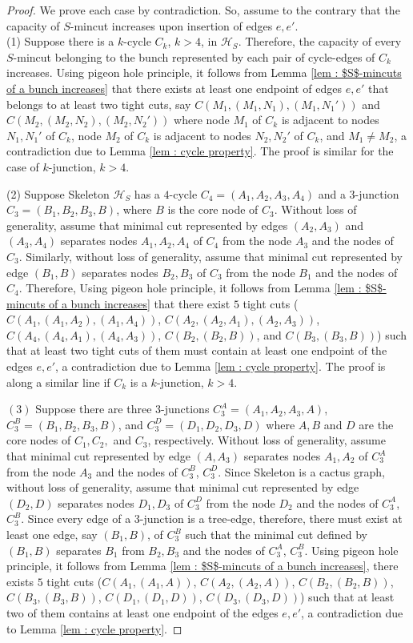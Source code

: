 \documentclass[letterpaper,11pt]{article}
\begin{document}
\begin{proof}
    We prove each case by contradiction. So, assume to the contrary that the capacity of $S$-mincut increases upon insertion of edges $e,e'$.\\
    (1) Suppose there is a $k$-cycle $C_{k}$, $k>4$, in ${\mathcal H}_S$.  Therefore, the capacity of every $S$-mincut belonging to the bunch represented by each pair of cycle-edges of $C_k$ increases. Using pigeon hole principle, it follows from Lemma \ref{lem : $S$-mincuts of a bunch increases} that there exists at least one endpoint of edges $e,e'$ that belongs to at least two tight cuts, say $C(M_1,(M_1,N_1),(M_1,N_1'))$ and $C(M_2,(M_2,N_2),(M_2,N_2'))$ where node $M_1$ of $C_k$ is adjacent to nodes $N_1,N_1'$ of $C_k$, node $M_2$ of $C_k$ is adjacent to nodes $N_2,N_2'$ of $C_k$, and $M_1\ne M_2$, a contradiction due to Lemma \ref{lem : cycle property}. The proof is similar for the case of $k$-junction, $k>4$. 

    \noindent
    (2) Suppose Skeleton ${\mathcal H}_S$ has a $4$-cycle $C_4=(A_1,A_2,A_3,A_4)$ and a $3$-junction $C_3=(B_1,B_2,B_3,B)$, where $B$ is the core node of $C_3$. Without loss of generality, assume that minimal cut represented by edges $(A_2,A_3)$ and $(A_3,A_4)$ separates nodes $A_1,A_2,A_4$ of $C_4$ from the node $A_3$ and the nodes of $C_3$. Similarly, without loss of generality, assume that minimal cut represented by edge $(B_1,B)$ separates nodes $B_2,B_3$ of $C_3$ from the node $B_1$ and the nodes of $C_4$.     
Therefore, Using pigeon hole principle, it follows from Lemma \ref{lem : $S$-mincuts of a bunch increases} that there exist $5$ tight cuts ($C(A_1, (A_1,A_2), (A_1,A_4))$, $C(A_2, (A_2,A_1), (A_2,A_3))$, $C(A_4,(A_4,A_1),(A_4,A_3))$, $C(B_2,(B_2,B))$, and $C(B_3,(B_3, B))$) such that at least two tight cuts of them must contain at least one endpoint of the edges $e,e'$, a contradiction due to Lemma \ref{lem : cycle property}. The proof is along a similar line if $C_k$ is a $k$-junction, $k>4$.


   \noindent
   $(3)$ Suppose there are three $3$-junctions $C_3^A=(A_1,A_2,A_3,A)$,  $C_3^B=(B_1,B_2,B_3,B)$, and $C_3^D=(D_1,D_2,D_3,D)$ where $A,B$ and $D$ are the core nodes of $C_1,C_2,$ and $C_3$, respectively. 
   Without loss of generality, assume that minimal cut represented by edge $(A,A_3)$ separates nodes $A_1,A_2$ of $C_3^A$ from the node $A_3$ and the nodes of $C_3^B$, $C_3^D$. Since Skeleton is a cactus graph, without loss of generality, assume that minimal cut represented by edge $(D_2,D)$ separates nodes $D_1,D_3$ of $C_3^D$ from the node $D_2$ and the nodes of $C_3^A$, $C_3^B$. Since every edge of a $3$-junction is a tree-edge, therefore, there must exist at least one edge, say $(B_1,B)$, of $C_3^B$ such that the minimal cut defined by $(B_1,B)$ separates $B_1$ from $B_2,B_3$ and the nodes of $C_3^A$, $C_3^B$. Using pigeon hole principle, it follows from Lemma \ref{lem : $S$-mincuts of a bunch increases}, there exists $5$ tight cuts ($C(A_1,(A_1,A))$, $C(A_2,(A_2,A))$, $C(B_2,(B_2,B))$, $C(B_3, (B_3,B))$, $C(D_1,(D_1,D))$, $C(D_3,(D_3,D))$) such that at least two of them contains at least one endpoint of the edges $e,e'$, a contradiction due to Lemma \ref{lem : cycle property}.
\end{proof}
\end{document}
